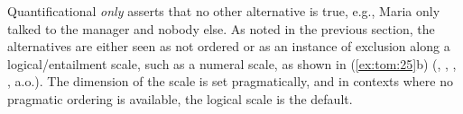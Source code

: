 \documentclass[output=paper,colorlinks,citecolor=brown]{langscibook}
\begin{document}

\noindent Quantificational \textit{only} asserts that no other alternative is true, e.g., Maria only talked to the manager and nobody else. As noted in the previous section, the alternatives are either seen as not ordered or as an instance of exclusion along a logical/entailment scale, such as a numeral scale, as shown in (\ref{ex:tom:25}b) (\citealt{vanrooij02}, \citealt{klinedinst05}, \citealt{riester06}, \citealt{coppockbeaver11}, a.o.). The dimension of the scale is set pragmatically, and in contexts where no pragmatic ordering is available, the logical scale is the default.
\end{document}
